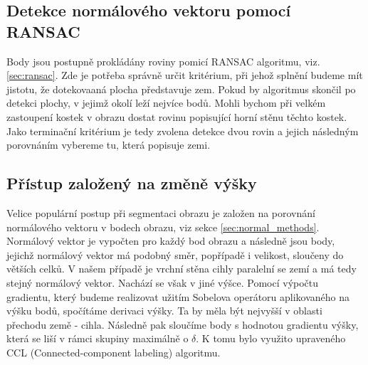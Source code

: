 \documentclass[twoside]{ctuthesis}
\begin{document}
\subsection{Detekce normálového vektoru pomocí RANSAC}
Body jsou postupně prokládány roviny pomicí RANSAC algoritmu, viz. \ref{sec:ransac}. Zde je potřeba správně určit kritérium, při jehož splnění budeme mít jistotu, že dotekovaaná plocha představuje zem. Pokud by algoritmus skončil po detekci plochy, v jejimž okolí leží nejvíce bodů. Mohli bychom při velkém zastoupení kostek v obrazu dostat rovinu popisující horní stěnu těchto kostek. Jako terminační kritérium je tedy zvolena detekce dvou rovin a jejich následným porovnáním vybereme tu, která popisuje zemi.

\subsection{Přístup založený na změně výšky}
Velice populární postup při segmentaci obrazu je založen na porovnání normálového vektoru v bodech obrazu, viz sekce \ref{sec:normal_methods}. Normálový vektor je vypočten pro každý bod obrazu a následně jsou body, jejichž normálový vektor má podobný směr, popřípadě i velikost, sloučeny do větších celků. V našem případě je vrchní stěna cihly paralelní se zemí a má tedy stejný normálový vektor. Nachází se však v jiné výšce. Pomocí výpočtu gradientu, který budeme realizovat užitím Sobelova operátoru aplikovaného na výšku bodů, spočítáme derivaci výšky. Ta by měla být nejvyšší v oblasti přechodu země - cihla. Následně pak sloučíme body s hodnotou gradientu výšky, která se liší v rámci skupiny maximálně o $\delta$. K tomu bylo využito upraveného CCL (Connected-component labeling) algoritmu. 
\end{document}
